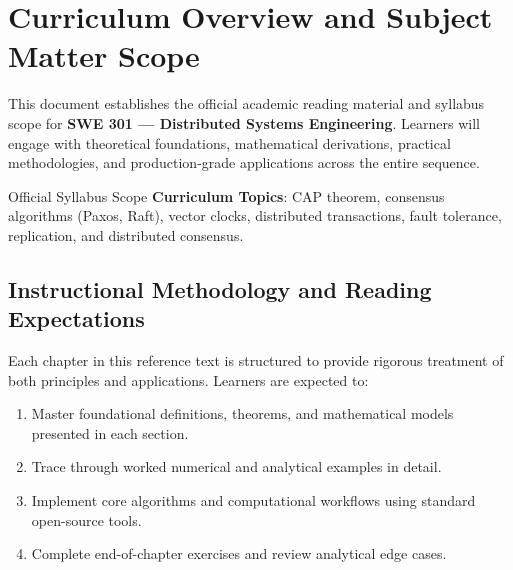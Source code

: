 \section{Curriculum Overview and Subject Matter Scope}

This document establishes the official academic reading material and syllabus scope for \textbf{SWE 301 --- Distributed Systems Engineering}. Learners will engage with theoretical foundations, mathematical derivations, practical methodologies, and production-grade applications across the entire sequence.

\begin{InsightBox}{Official Syllabus Scope}
  \textbf{Curriculum Topics}: CAP theorem, consensus algorithms (Paxos, Raft), vector clocks, distributed transactions, fault tolerance, replication, and distributed consensus.
\end{InsightBox}

\subsection{Instructional Methodology and Reading Expectations}

Each chapter in this reference text is structured to provide rigorous treatment of both principles and applications. Learners are expected to:
\begin{enumerate}
  \item Master foundational definitions, theorems, and mathematical models presented in each section.
  \item Trace through worked numerical and analytical examples in detail.
  \item Implement core algorithms and computational workflows using standard open-source tools.
  \item Complete end-of-chapter exercises and review analytical edge cases.
\end{enumerate}

